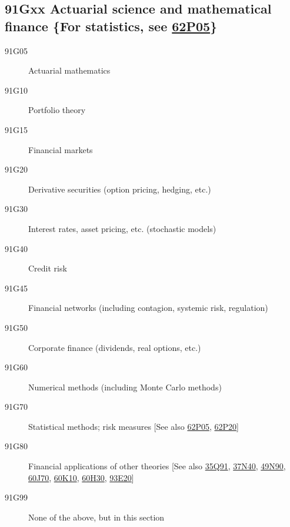 \subsection*{91Gxx  Actuarial science and mathematical finance \{For statistics, see \hyperref[62P05]{62P05}\} }\label{91Gxx}
\begin{description}  
\item [91G05]\label{91G05} Actuarial mathematics
\item [91G10]\label{91G10} Portfolio theory
\item [91G15]\label{91G15} Financial markets
\item [91G20]\label{91G20} Derivative securities (option pricing, hedging, etc.)
\item [91G30]\label{91G30} Interest rates, asset pricing, etc. (stochastic models)
\item [91G40]\label{91G40} Credit risk
\item [91G45]\label{91G45} Financial networks (including contagion, systemic risk, regulation)
\item [91G50]\label{91G50} Corporate finance (dividends, real options, etc.)
\item [91G60]\label{91G60} Numerical methods (including Monte Carlo methods)
\item [91G70]\label{91G70} Statistical methods; risk measures [See also \hyperref[62P05]{62P05}, \hyperref[62P20]{62P20}]
\item [91G80]\label{91G80} Financial applications of other theories [See also \hyperref[35Q91]{35Q91}, \hyperref[37N40]{37N40}, \hyperref[49N90]{49N90}, \hyperref[60J70]{60J70}, \hyperref[60K10]{60K10}, \hyperref[60H30]{60H30}, \hyperref[93E20]{93E20}]
\item [91G99]\label{91G99} None of the above, but in this section
\end{description}
